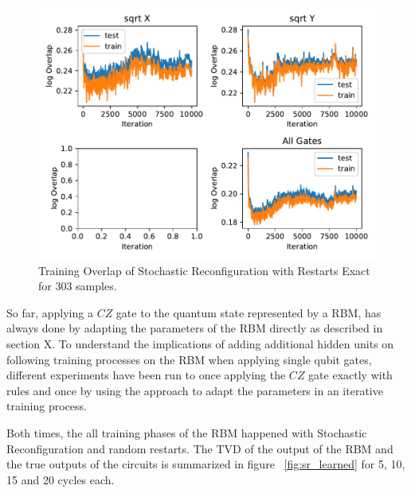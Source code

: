 \begin{figure}[H]
  \centering
  \includegraphics[width=\textwidth]{figures/results/SR-restarts-not-learned/avgOverlap_303.pdf}
  \caption[Training Overlap of Stochastic Reconfiguration with Restarts Exact]{Training 
  Overlap of Stochastic Reconfiguration with Restarts Exact for 303 samples.}
  \label{fig:sr_tvd}
\end{figure}

\iffalse
So far, applying a $CZ$ gate to the quantum state represented by a RBM, has always done 
by adapting the parameters of the RBM directly as described in section X. To understand the 
implications of adding additional hidden units on following training processes on the RBM when 
applying single qubit gates, different experiments have been run to once applying the $CZ$ gate 
exactly with rules and once by using the approach to adapt the parameters in an iterative training 
process.

Both times, the all training phases of the RBM happened with Stochastic Reconfiguration and random restarts.
The TVD of the output of the RBM and the true outputs of the circuits is summarized in 
figure ~\ref{fig:sr_learned} for 5, 10, 15 and 20 cycles each.


